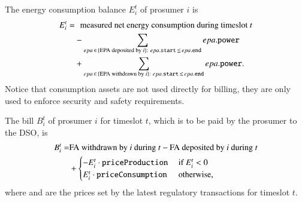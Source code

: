 The energy consumption balance $E_i^t$ of prosumer $i$ is
\begin{align*}
E_i^t = & \hphantom{+} \text{measured net energy consumption during timeslot } t \\ %
 & - \sum_{epa \,\in\, \{\text{EPA deposited by } i\}: ~ epa.\field{start} \,\leq\, epa.\field{end}} epa.\field{power} \\
 & + \sum_{epa \,\in\, \{\text{EPA withdrawn by } i\}: ~ epa.\field{start} \,\leq\, epa.\field{end}} epa.\field{power} .
\end{align*}
Notice that consumption assets are not used directly for billing, they are only used to enforce security and safety requirements.

The bill $B_i^t$ of prosumer $i$ for timeslot $t$, which is to be paid by the prosumer to the DSO, is
\begin{align*}
B_i^t = &  \text{FA withdrawn by $i$ during $t$} - \text{FA deposited by $i$ during $t$} \\
 & + \begin{cases}
- E_i^t \cdot \texttt{priceProduction} & \text{ if } E_i^t < 0 \\
 E_i^t \cdot \texttt{priceConsumption} & \text{ otherwise,} 
\end{cases}
\end{align*}
where {} and {} are the prices set by the latest regulatory transactions for timeslot $t$.

